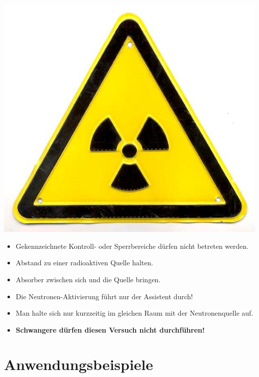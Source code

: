 \begin{minipage}{0.4\textwidth}
	\includegraphics[width=\textwidth]{Versuch_19-20/Abbildungen/Schild.jpg}
	\label{fig:Schild}
\end{minipage}
%
\begin{minipage}{0.6\textwidth}
	\begin{itemize}
		\item Gekennzeichnete Kontroll- oder Sperrbereiche dürfen nicht betreten werden.
		\item Abstand zu einer radioaktiven Quelle halten.
		\item Absorber zwischen sich und die Quelle bringen.
		\item Die Neutronen-Aktivierung führt nur der Assistent durch!
		\item Man halte sich nur kurzzeitig im gleichen Raum mit der Neutronenquelle auf.
		\item \textbf{Schwangere dürfen diesen Versuch nicht durchführen!}
	\end{itemize}
\end{minipage}

\section{Anwendungsbeispiele}

